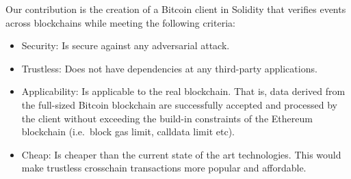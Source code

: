 Our contribution is the creation of a Bitcoin client in Solidity that
verifies events across blockchains while meeting the following criteria:
\begin{itemize}
    \item
        Security: Is secure against any adversarial attack.
    \item
        Trustless: Does not have dependencies at any third-party applications.
    \item
        Applicability: Is applicable to the real blockchain. That is, data
        derived from the full-sized Bitcoin blockchain are successfully
        accepted and processed by the client without exceeding the build-in
        constraints of the Ethereum blockchain (i.e.\ block gas limit, calldata
        limit etc).
    \item
        Cheap: Is cheaper than the current state of the art technologies. This
        would make trustless crosschain transactions more popular and
        affordable.
\end{itemize}

\pagebreak
